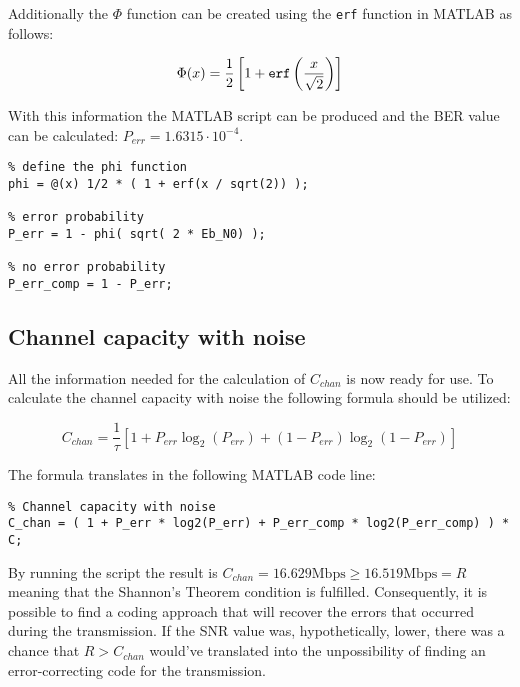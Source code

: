 \noindent Additionally the $\Phi$ function can be created using the \texttt{erf} function in MATLAB as follows:

\begin{equation*}
    \Phi(x) = \frac{1}{2} \left[ 1 + \text{\texttt{erf}} \left( \frac{x}{\sqrt{2}} \right) \right]
\end{equation*}

\noindent With this information the MATLAB script can be produced and the BER value can be calculated: $P_{err} = 1.6315 \cdot 10^{-4} $.

\begin{lstlisting}
% define the phi function
phi = @(x) 1/2 * ( 1 + erf(x / sqrt(2)) );

% error probability
P_err = 1 - phi( sqrt( 2 * Eb_N0) ); 

% no error probability
P_err_comp = 1 - P_err; 
\end{lstlisting}


\subsection{Channel capacity with noise}
All the information needed for the calculation of $C_{chan}$ is now ready for use. To calculate the channel capacity with noise the following formula should be utilized:

\begin{equation*}
    C_{chan} = \frac{1}{\tau}\left[ 1 + P_{err}\log_2\left( P_{err} \right) + \left( 1 - P_{err} \right)\log_2 \left(  1 - P_{err} \right) \right] 
\end{equation*}

\noindent The formula translates in the following MATLAB code line:

\begin{lstlisting}
% Channel capacity with noise
C_chan = ( 1 + P_err * log2(P_err) + P_err_comp * log2(P_err_comp) ) * C;
\end{lstlisting}

\noindent By running the script the result is $C_{chan} = 16.629 \text{Mbps} \geq 16.519 \text{Mbps} = R$ meaning that the Shannon's Theorem condition is fulfilled. Consequently, it is possible to find a coding approach that will recover the errors that occurred during the transmission. If the SNR value was, hypothetically, lower, there was a chance that $R > C_{chan}$ would've translated into the unpossibility of finding an error-correcting code for the transmission.
